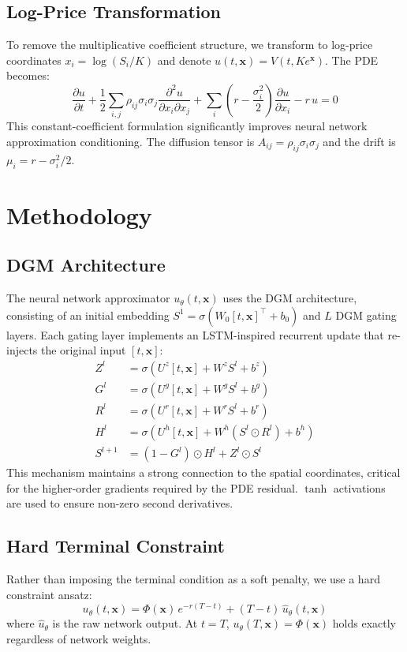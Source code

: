 \documentclass{article}
\begin{document}
\subsection{Log-Price Transformation}
To remove the multiplicative coefficient structure, we transform to log-price coordinates $x_i = \log(S_i / K)$ and denote $u(t, \mathbf{x}) = V(t, K e^{\mathbf{x}})$. The PDE becomes:
\begin{equation}
\frac{\partial u}{\partial t} + \frac{1}{2}\sum_{i,j} \rho_{ij}\sigma_i\sigma_j \frac{\partial^2 u}{\partial x_i \partial x_j} + \sum_i \left(r - \frac{\sigma_i^2}{2}\right)\frac{\partial u}{\partial x_i} - r\,u = 0
\end{equation}
This constant-coefficient formulation significantly improves neural network approximation conditioning. The diffusion tensor is $A_{ij} = \rho_{ij}\sigma_i\sigma_j$ and the drift is $\mu_i = r - \sigma_i^2/2$.

\section{Methodology}
\subsection{DGM Architecture}
The neural network approximator $u_\theta(t, \mathbf{x})$ uses the DGM architecture, consisting of an initial embedding $S^1 = \sigma(W_0 [t, \mathbf{x}]^\top + b_0)$ and $L$ DGM gating layers. Each gating layer implements an LSTM-inspired recurrent update that re-injects the original input $[t, \mathbf{x}]$:
\begin{align}
Z^l &= \sigma(U^z [t,\mathbf{x}] + W^z S^l + b^z) \\
G^l &= \sigma(U^g [t,\mathbf{x}] + W^g S^l + b^g) \\
R^l &= \sigma(U^r [t,\mathbf{x}] + W^r S^l + b^r) \\
H^l &= \sigma(U^h [t,\mathbf{x}] + W^h (S^l \odot R^l) + b^h) \\
S^{l+1} &= (1 - G^l) \odot H^l + Z^l \odot S^l
\end{align}
This mechanism maintains a strong connection to the spatial coordinates, critical for the higher-order gradients required by the PDE residual. $\tanh$ activations are used to ensure non-zero second derivatives.

\subsection{Hard Terminal Constraint}
Rather than imposing the terminal condition as a soft penalty, we use a hard constraint ansatz:
\begin{equation}
u_\theta(t, \mathbf{x}) = \Phi(\mathbf{x})\,e^{-r(T-t)} + (T - t)\,\hat{u}_\theta(t, \mathbf{x})
\end{equation}
where $\hat{u}_\theta$ is the raw network output. At $t = T$, $u_\theta(T, \mathbf{x}) = \Phi(\mathbf{x})$ holds exactly regardless of network weights.
\end{document}
